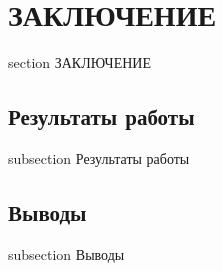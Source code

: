 \newpage
\section*{ЗАКЛЮЧЕНИЕ}
 {section} {ЗАКЛЮЧЕНИЕ}

\subsection*{Результаты работы}
 {subsection} {Результаты работы}

\subsection*{Выводы}
 {subsection} {Выводы}
